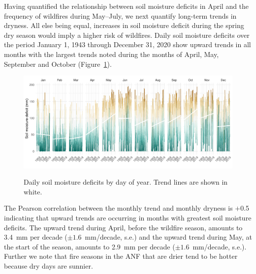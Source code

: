 \documentclass[12pt]{iopart}
\begin{document}
Having quantified the relationship between soil moisture deficits in April and the frequency of wildfires during May--July, we next quantify long-term trends in dryness. All else being equal, increases in soil moisture deficit during the spring dry season would imply a higher risk of wildfires. Daily soil moisture deficits over the period January 1, 1943 through December 31, 2020 show upward trends in all months with the largest trends noted during the months of April, May, September and October (Figure~\ref{Trends}). 
\begin{figure}[t]
\noindent\includegraphics[scale=.67,trim=0in 0in 0in 0in,clip]{Trends.pdf}\\
\vspace{0in}
\caption{Daily soil moisture deficits by day of year. Trend lines are shown in white.}
\label{Trends}
\end{figure}

The Pearson correlation between the monthly trend and monthly dryness is $+$0.5 indicating that upward trends are occurring in months with greatest soil moisture deficits. The upward trend during April, before the wildfire season, amounts to 3.4~mm per decade ($\pm 1.6$~mm/decade, s.e.) and the upward trend during May, at the start of the season, amounts to 2.9~mm per decade ($\pm 1.6$~mm/decade, s.e.). Further we note that fire seasons in the ANF that are drier tend to be hotter because dry days are sunnier.
\end{document}
